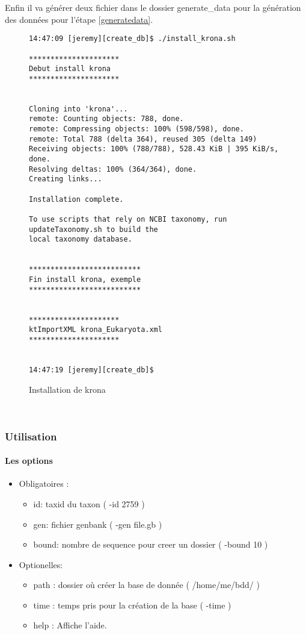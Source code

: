 Enfin il va générer deux fichier dans le dossier generate\_data pour la génération
des données pour l'étape \ref{generatedata}.
~\\
\begin{figure}[H]

\begin{center}
\begin{verbatim}
14:47:09 [jeremy][create_db]$ ./install_krona.sh 

*********************
Debut install krona
*********************


Cloning into 'krona'...
remote: Counting objects: 788, done.
remote: Compressing objects: 100% (598/598), done.
remote: Total 788 (delta 364), reused 305 (delta 149)
Receiving objects: 100% (788/788), 528.43 KiB | 395 KiB/s, done.
Resolving deltas: 100% (364/364), done.
Creating links...

Installation complete.

To use scripts that rely on NCBI taxonomy, run updateTaxonomy.sh to build the
local taxonomy database.


**************************
Fin install krona, exemple
**************************


*********************
ktImportXML krona_Eukaryota.xml
*********************


14:47:19 [jeremy][create_db]$ 

  \end{verbatim}
\end{center}
\caption{\label{krona}Installation de krona}
\end{figure}
~\\

\subsubsection{Utilisation}
\paragraph{Les options}
\begin{itemize}
 \item Obligatoires :
\begin{itemize}
 
     \item id: taxid du taxon  ( -id 2759 )
     \item gen: fichier genbank ( -gen file.gb )
    \item bound: nombre de sequence pour creer un dossier ( -bound 10 )
  \end{itemize}
  \item Optionelles:
  \begin{itemize}
    \item path : dossier où créer la base de donnée ( /home/me/bdd/ )
    \item time : temps pris pour la création de la base ( -time )
    \item help : Affiche l'aide.
  \end{itemize}
\end{itemize}

